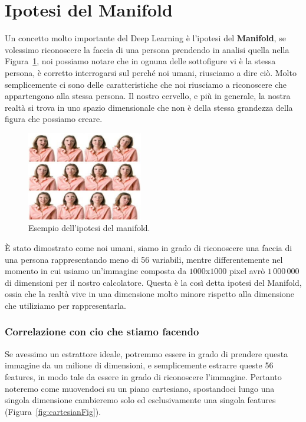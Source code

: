 \section{Ipotesi del Manifold}
Un concetto molto importante del Deep Learning è l'ipotesi del \textbf{Manifold}, se volessimo riconoscere la faccia di una persona prendendo in analisi quella nella Figura~\ref{fig:manifold}, noi possiamo notare che in ognuna delle sottofigure vi è la stessa persona, è corretto interrogarsi sul perché noi umani, riusciamo a dire ciò. Molto semplicemente ci sono delle caratteristiche che noi riusciamo a riconoscere che appartengono alla stessa persona. Il nostro cervello, e più in generale, la nostra realtà si trova in uno spazio dimensionale che non è della stessa grandezza della figura che possiamo creare.

\begin{figure}[h]
    \centering
    \includegraphics[width=0.45\textwidth]{figure/Manifold.png}
    \caption{Esempio dell'ipotesi del manifold.}
    \label{fig:manifold}
\end{figure}


È stato dimostrato come noi umani, siamo in grado di riconoscere una faccia di una persona rappresentando meno di 56 variabili, mentre differentemente nel momento in cui usiamo un'immagine composta da $1000$x$1000$ pixel avrò $1\,000\,000$ di dimensioni per il nostro calcolatore. Questa è la così detta ipotesi del Manifold, ossia che la realtà vive in una dimensione molto minore rispetto alla dimensione che utiliziamo per rappresentarla. 

\subsubsection{Correlazione con cio che stiamo facendo}
Se avessimo un estrattore ideale, potremmo essere in grado di prendere questa immagine da un milione di dimensioni, e semplicemente estrarre queste 56 features, in modo tale da essere in grado di riconoscere l'immagine. Pertanto noteremo come muovendoci su un piano cartesiano, spostandoci lungo una singola dimensione cambieremo solo ed esclusivamente una singola features (Figura~\ref{fig:cartesianFig}).

